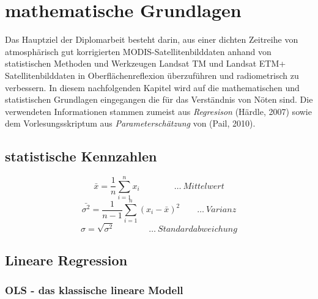 \documentclass[11pt]{report}
\begin{document}
% 

\section{mathematische Grundlagen}

Das Hauptziel der Diplomarbeit besteht darin, aus einer dichten Zeitreihe von atmosphärisch gut korrigierten MODIS-Satellitenbilddaten anhand von statistischen Methoden und Werkzeugen Landsat TM und Landsat ETM+ Satellitenbilddaten in Oberflächenreflexion überzuführen und radiometrisch zu verbessern. In diesem nachfolgenden Kapitel wird auf die mathematischen und statistischen Grundlagen eingegangen die für das Verständnis von Nöten sind. Die verwendeten Informationen stammen zumeist aus \textit{Regresison} (Härdle, 2007) sowie dem Vorlesungsskriptum aus \textit{Parameterschätzung} von (Pail, 2010).

\subsection{statistische Kennzahlen}
\begin{equation}
\bar{x}=\frac{1}{n}\sum_{i=1}^{n} x_i \qquad\qquad \dots \ Mittelwert
\end{equation}
\begin{equation}
\bar{\sigma^2}=\frac{1}{n-1}\sum_{i=1}^{n} (x_i - \bar{x})^2 \qquad \dots \ Varianz
\end{equation}
\begin{equation}
\sigma=\sqrt{\sigma^2} \qquad\qquad \dots \ Standardabweichung
\end{equation}


\subsection{Lineare Regression}
\subsubsection{OLS - das klassische lineare Modell}
\end{document}
